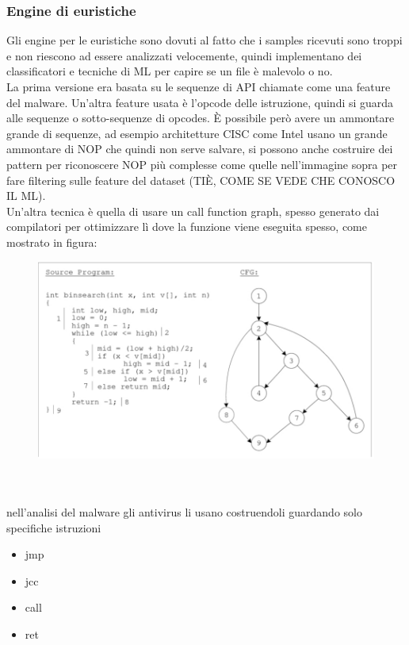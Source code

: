 \documentclass[12pt, oneside]{extbook} %
\begin{document}
\subsubsection{Engine di euristiche}
Gli engine per le euristiche sono dovuti al fatto che i samples ricevuti sono troppi e non riescono ad essere analizzati velocemente, quindi implementano dei classificatori e tecniche di ML per capire se un file è malevolo o no.\\La prima versione era basata su le sequenze di API chiamate come una feature del malware. Un'altra feature usata è l'opcode delle istruzione, quindi si guarda alle sequenze o sotto-sequenze di opcodes. È possibile però avere un ammontare grande di sequenze, ad esempio architetture CISC come Intel usano un grande ammontare di NOP che quindi non serve salvare, si possono anche costruire dei pattern per riconoscere NOP più complesse come quelle nell'immagine sopra per fare filtering sulle feature del dataset (TIÈ, COME SE VEDE CHE CONOSCO IL ML).\\Un'altra tecnica è quella di usare un call function graph, spesso generato dai compilatori per ottimizzare lì dove la funzione viene eseguita spesso, come mostrato in figura:\\
\begin{figure}[!h]
	\includegraphics[scale=0.3]{immagini/flow_graph.png}
\end{figure}\\\\
nell'analisi del malware gli antivirus li usano costruendoli guardando solo specifiche istruzioni
\begin{itemize}
\item jmp
\item jcc
\item call
\item ret
\end{itemize}
\end{document}
